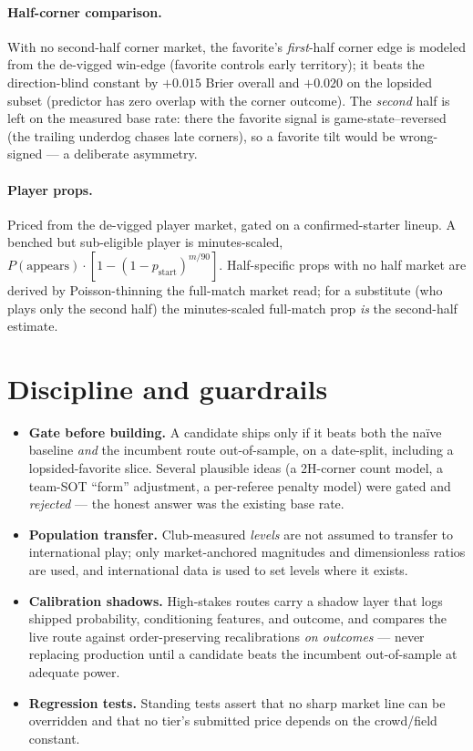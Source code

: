 \documentclass[11pt]{article}
\begin{document}
\paragraph{Half-corner comparison.} With no second-half corner market, the favorite's
\emph{first}-half corner edge is modeled from the de-vigged win-edge (favorite controls early
territory); it beats the direction-blind constant by $+0.015$ Brier overall and $+0.020$ on the
lopsided subset (predictor has zero overlap with the corner outcome). The \emph{second} half is
left on the measured base rate: there the favorite signal is game-state--reversed (the trailing
underdog chases late corners), so a favorite tilt would be wrong-signed --- a deliberate asymmetry.

\paragraph{Player props.} Priced from the de-vigged player market, gated on a confirmed-starter
lineup. A benched but sub-eligible player is minutes-scaled,
$P(\text{appears})\cdot[1-(1-p_{\text{start}})^{m/90}]$. Half-specific props with no half market are
derived by Poisson-thinning the full-match market read; for a substitute (who plays only the second
half) the minutes-scaled full-match prop \emph{is} the second-half estimate.

\section{Discipline and guardrails}
\begin{itemize}
\item \textbf{Gate before building.} A candidate ships only if it beats both the na\"ive baseline
\emph{and} the incumbent route out-of-sample, on a date-split, including a lopsided-favorite slice.
Several plausible ideas (a 2H-corner count model, a team-SOT ``form'' adjustment, a per-referee
penalty model) were gated and \emph{rejected} --- the honest answer was the existing base rate.
\item \textbf{Population transfer.} Club-measured \emph{levels} are not assumed to transfer to
international play; only market-anchored magnitudes and dimensionless ratios are used, and
international data is used to set levels where it exists.
\item \textbf{Calibration shadows.} High-stakes routes carry a shadow layer that logs shipped
probability, conditioning features, and outcome, and compares the live route against
order-preserving recalibrations \emph{on outcomes} --- never replacing production until a candidate
beats the incumbent out-of-sample at adequate power.
\item \textbf{Regression tests.} Standing tests assert that no sharp market line can be overridden
and that no tier's submitted price depends on the crowd/field constant.
\end{itemize}
\end{document}
